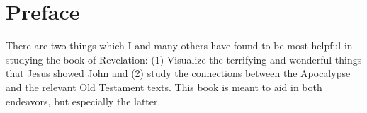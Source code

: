 \ClearShipoutPicture
{}

\blankpage
\clearpage
\clearpage

\begin{KeepFromToc}
\tableofcontents
\end{KeepFromToc}
\clearpage
\listoffigures
\clearpage

\chapter{Preface}
There are two things which I and many others have found to be most helpful in studying the book of Revelation: (1) Visualize the terrifying and wonderful things that Jesus showed John and (2) study the connections between the Apocalypse and the relevant Old Testament texts. This book is meant to aid in both endeavors, but especially the latter. \\

